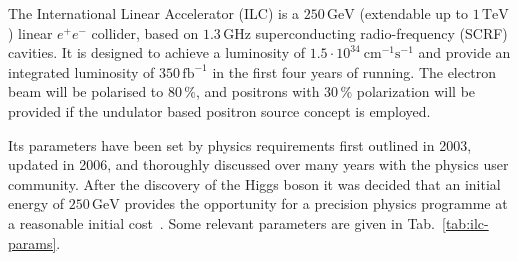 

The International Linear Accelerator (ILC) is a $250\,{\mathrm{GeV}}$ (extendable up to $1\,{\mathrm{TeV}}$) linear $e^+e^-$ collider, based on $1.3\,{\mathrm{GHz}}$ superconducting radio-frequency (SCRF) cavities.
It is designed to  achieve a luminosity of $1.5\cdot 10^{34}~{\mathrm{cm}}^{-1}{\mathrm{s}}^{-1}$ and provide an integrated luminosity of $350\,{\mathrm{fb}}^{-1}$ in the first four years of running.
The electron beam will be polarised to $80\,\%$, and positrons with $30\,\%$ polarization will be provided if the undulator based positron source concept is employed. 

Its parameters have been set by physics requirements first outlined in 2003,
updated in 2006, and thoroughly discussed over many years with the physics user community. 
After the discovery of the Higgs boson it was decided that an initial energy of $250\,{\mathrm{GeV}}$ provides the opportunity for a precision physics programme at a reasonable initial cost~\cite{Evans:2017rvt}.
Some relevant parameters are given in Tab.~\ref{tab:ilc-params}.

